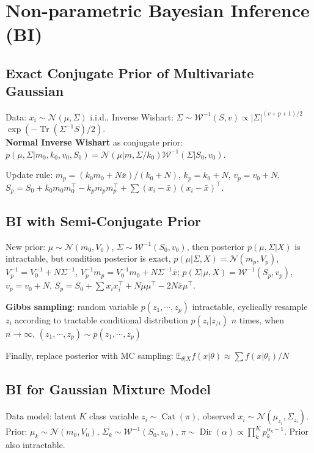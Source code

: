 \section{Non-parametric Bayesian Inference (BI)}

\subsection*{Exact Conjugate Prior of Multivariate Gaussian}
Data: $x_i\sim \mathcal{N}(\mu,\Sigma)$ i.i.d.. Inverse Wishart: $\Sigma \sim \mathcal{W}^{-1}(S, v) \propto |\Sigma|^{(v+p+1)/2}$ $\exp( - \operatorname{Tr}( \Sigma^{-1} S)/2 )$. \\
\textbf{Normal Inverse Wishart} as conjugate prior:\\ $p(\mu, \Sigma | m_0, k_0, v_0, S_0) = \mathcal{N}(\mu | m, \Sigma/k_0)\mathcal{W}^{-1}(\Sigma | S_0,v_0)$. 

Update rule: $m_p = (k_0 m_0+N\bar{x})/(k_0+N)$, $k_p = k_0 + N$, $v_p =v_0 + N$, $S_p =S_0 + k_0 m_0 m_0^{\top} - k_p m_p m_p^{\top} + \sum (x_i-\bar{x})(x_i-\bar{x})^{\top}$. 


\subsection*{BI with Semi-Conjugate Prior}
New prior: $\mu\sim \mathcal{N}(m_0,V_0)$, $\Sigma \sim \mathcal{W}^{-1}(S_0, v_0)$, then posterior $p(\mu,\Sigma | X)$ is intractable, but condition posterior is exact, $p(\mu | \Sigma, X) = \mathcal{N}(m_p,V_p)$, $V_p^{-1} = V_0^{-1} + N\Sigma^{-1}$, $V_p^{-1}m_p = V_0^{-1} m_0 + N\Sigma^{-1}\bar{x}$; $p(\Sigma | \mu, X) = \mathcal{W}^{-1}(S_p,v_p)$, $v_p = v_0 + N$, $S_p = S_0 +\sum x_ix_i^{\top} + N\mu\mu^{\top} - 2N\bar{x}\mu^{\top}$. 

\textbf{Gibbs sampling}: random variable $p(z_1,\cdots, z_p)$ intractable, cyclically resample $z_i$ according to tractable conditional distribution $p(z_i | z_{/i})$ $n$ times, when $n\to \infty$, $(z_1,\cdots, z_p)\sim p(z_1,\cdots, z_p)$ 

Finally, replace posterior with MC sampling: $\mathbb{E}_{\theta | X} f(x| \theta) \approx \sum f(x| \theta_i) / N$

\subsection*{BI for Gaussian Mixture Model}
Data model: latent $K$ class variable $z_i \sim \operatorname{Cat}(\pi)$, observed $x_i\sim \mathcal{N}(\mu_{z_i}, \Sigma_{z_i})$. Prior: $\mu_k \sim \mathcal{N}(m_0,V_0)$, $\Sigma_k \sim \mathcal{W}^{-1}(S_0, v_0)$, $\pi\sim \operatorname{Dir}(\alpha)\propto\prod_k^{K} p_{k}^{\alpha_k-1}$. Prior also intractable. 

